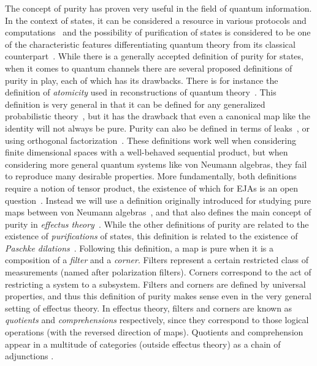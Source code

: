 \documentclass[submission,copyright,creativecommons]{eptcs}
\newcounter{main}
\theoremstyle{definition}
\begin{document}
The concept of purity has proven very useful in the field of quantum
information. In the context of states, it can be considered a
resource in various protocols and computations~\cite{devetak2005distillation,brandao2013resource} and the
possibility of purification of states is considered to be one of
the characteristic features differentiating quantum theory from its
classical counterpart~\cite{chiribella2010probabilistic,chiribella2011informational}.
While there is a generally accepted definition of purity for states,
when it comes to quantum channels there are several proposed definitions of
purity in play, each of which has its drawbacks.
There is for instance the definition of \emph{atomicity}
used in reconstructions of quantum theory~\cite{chiribella2011informational}.
This definition is very general in that it can be defined for any generalized probabilistic theory~\cite{barrett2007information},
but it has the drawback that even a canonical map like the identity will not always be pure.
Purity can also be defined in terms of leaks~\cite{selby2018reconstructing},
or using orthogonal factorization~\cite{cunningham2017purity}.
These definitions work well when considering finite dimensional spaces with a well-behaved sequential product,
but when considering more general quantum systems like von Neumann algebras, they fail to reproduce many desirable properties.
More fundamentally,
    both definitions require a notion of tensor product,
    the existence of which for EJAs is an open question~\cite{barnum2016composites}.
Instead we will use a definition originally introduced for studying pure maps between von Neumann algebras~\cite{bramthesis,westerbaan2016paschke,westerbaan2016universal},
and that also defines the main concept of purity in \emph{effectus theory}~\cite{cho2015introduction,basthesis}.
While the other definitions of purity are related to the existence of \emph{purifications} of states, 
this definition is related to the existence of \emph{Paschke dilations}~\cite{westerbaan2016paschke}.
Following this definition, a map is pure when it is a composition of a \emph{filter} and a \emph{corner}. 
Filters represent a certain restricted class of measurements
    (named after polarization filters).
Corners correspond to the act of restricting a system to a subsystem.
Filters and corners are defined by universal properties,
    and thus this definition of purity makes sense even in the very
    general setting of effectus theory.
In effectus theory, filters and corners are known as \emph{quotients}
and \emph{comprehensions} respectively, since they correspond to those logical
operations (with the reversed direction of maps).
Quotients and comprehension appear in a multitude of categories
    (outside effectus theory) as a chain of adjunctions \cite{cho2015quotient}.
\end{document}
